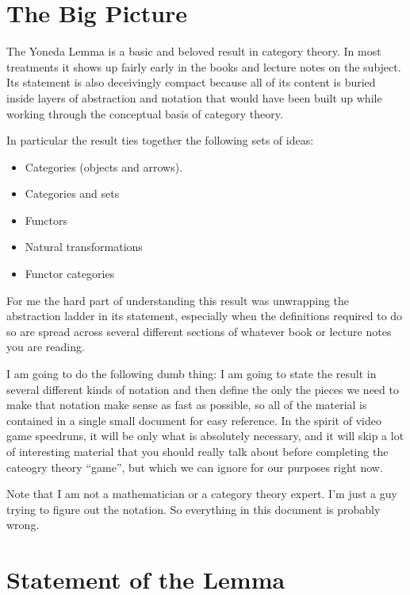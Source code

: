 
\section{The Big Picture}

The Yoneda Lemma is a basic and beloved result in category theory. In most treatments it
shows up fairly early in the books and lecture notes on the subject. Its statement is also
deceivingly compact because all of its content is buried inside layers of abstraction and
notation that would have been built up while working through the conceptual basis of
category theory.

In particular the result ties together the following sets of ideas:

\begin{itemize}

\item Categories (objects and arrows).
\item Categories and sets
\item Functors
\item Natural transformations
\item Functor categories

\end{itemize}

\noindent
For me the hard part of understanding this result was unwrapping the abstraction ladder in
its statement, especially when the definitions required to do so are spread across several
different sections of whatever book or lecture notes you are reading.

I am going to do the following dumb thing: I am going to state the result in several
different kinds of notation and then define the only the pieces we need to make that
notation make sense as fast as possible, so all of the material is contained in a single
small document for easy reference. In the spirit of video game speedruns, it will be only
what is absolutely necessary, and it will skip a lot of interesting material that you
should really talk about before completing the cateogry theory ``game'', but which we can
ignore for our purposes right now.

Note that I am not a mathematician or a category theory expert. I'm just a guy trying to
figure out the notation. So everything in this document is probably wrong.

\section{Statement of the Lemma}

